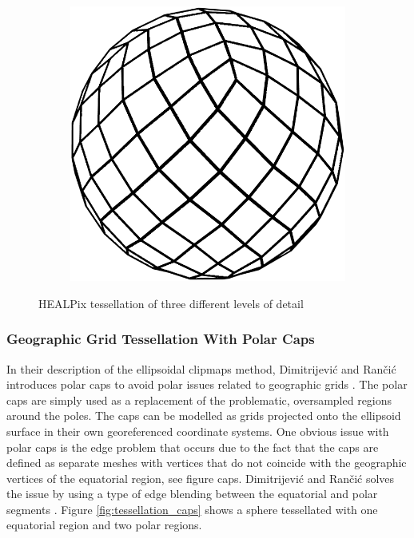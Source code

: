 \begin{figure}
\begin{subfigure}[b]{0.2\textwidth}
    \end{subfigure}
    ~ %
    \begin{subfigure}[b]{0.2\textwidth}
        \includegraphics[width=\textwidth]{figures/tessellation/tessellation_healpix3.png}
    \end{subfigure}
    \caption{HEALPix tessellation of three different levels of detail}
    \label{fig:tessellation_healpix}
\end{figure}

\subsubsection{Geographic Grid Tessellation With Polar Caps}

In their description of the ellipsoidal clipmaps method, Dimitrijevi\'{c} and Ran\v{c}i\'{c} introduces polar caps to avoid polar issues related to geographic grids \cite{dimi15}. The polar caps are simply used as a replacement of the problematic, oversampled regions around the poles. The caps can be modelled as grids projected onto the ellipsoid surface in their own georeferenced coordinate systems. One obvious issue with polar caps is the edge problem that occurs due to the fact that the caps are defined as separate meshes with vertices that do not coincide with the geographic vertices of the equatorial region, see figure caps. Dimitrijevi\'{c} and Ran\v{c}i\'{c} solves the issue by using a type of edge blending between the equatorial and polar segments \cite{dimi15}. Figure \ref{fig:tessellation_caps} shows a sphere tessellated with one equatorial region and two polar regions.

